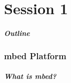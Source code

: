 \part{Session 1}

\begin{frame}[t]
	\frametitle{Outline}
	\tableofcontents[part=1,pausesections]
\end{frame}

\section{mbed Platform}
\begin{frame}[t]
	\frametitle{What is mbed?}
\end{frame}